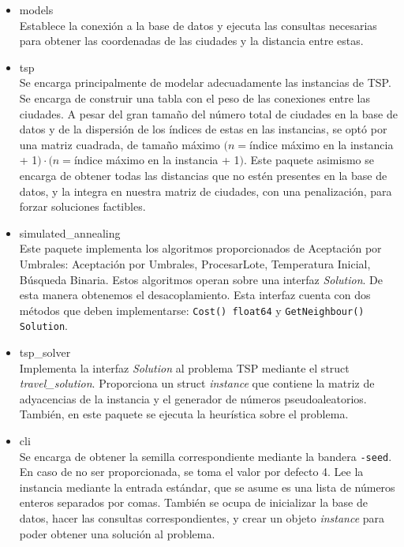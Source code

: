 \documentclass[12pt,letterpaper]{article}
\begin{document}
\begin{itemize}
    \item models\\
    Establece la conexión a la base de datos y ejecuta las consultas necesarias para obtener las coordenadas de las ciudades y la distancia entre estas.
    \item tsp\\
    Se encarga principalmente de modelar adecuadamente las instancias de TSP. Se encarga de construir una tabla con el peso de las conexiones entre las ciudades. A pesar del gran tamaño del número total de ciudades en la base de datos y de la dispersión de los índices de estas en las instancias, se optó por una matriz cuadrada, de tamaño máximo $(n=$índice máximo en la instancia + 1$)\cdot(n=$índice máximo en la instancia + 1$)$.
    Este paquete asimismo se encarga de obtener todas las distancias que no estén presentes en la base de datos, y la integra en nuestra matriz de ciudades, con una penalización, para forzar soluciones factibles.
    \item simulated\_annealing\\
    Este paquete implementa los algoritmos proporcionados de Aceptación por Umbrales: Aceptación por Umbrales, ProcesarLote, Temperatura Inicial, Búsqueda Binaria. Estos algoritmos operan sobre una interfaz \textit{Solution}. De esta manera obtenemos el desacoplamiento. Esta interfaz cuenta con dos métodos que deben implementarse: \texttt{Cost() float64} y \texttt{GetNeighbour() Solution}.
    \item tsp\_solver\\
    Implementa la interfaz \textit{Solution} al problema TSP mediante el struct \textit{travel\_solution}. Proporciona un struct \textit{instance} que contiene la matriz de adyacencias de la instancia y el generador de números pseudoaleatorios. También, en este paquete se ejecuta la heurística sobre el problema.
    \item cli\\
    Se encarga de obtener la semilla correspondiente mediante la bandera \texttt{-seed}. En caso de no ser proporcionada, se toma el valor por defecto 4. Lee la instancia mediante la entrada estándar, que se asume es una lista de números enteros separados por comas. También se ocupa de inicializar la base de datos, hacer las consultas correspondientes, y crear un objeto \textit{instance} para poder obtener una solución al problema.
\end{itemize}
\end{document}
